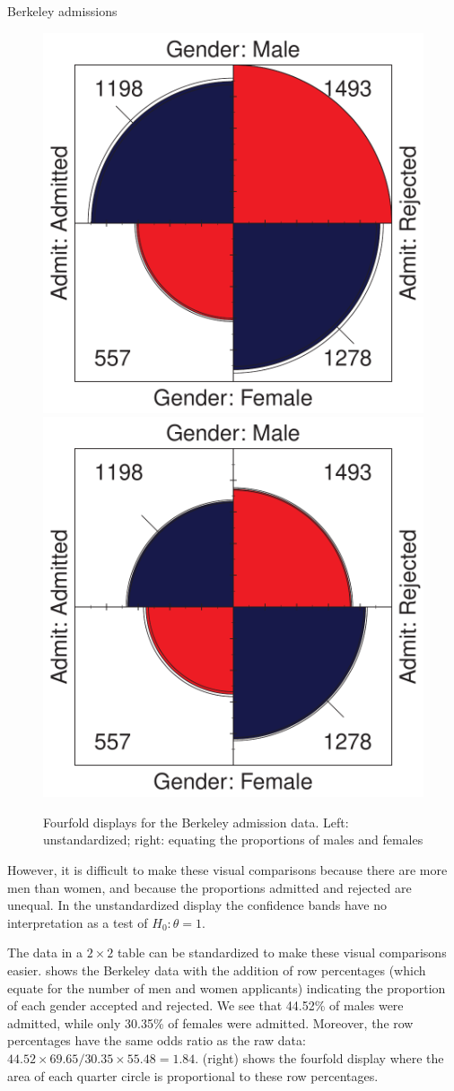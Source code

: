 \documentclass[10pt,krantz2]{krantz}\usepackage[]{graphicx}\usepackage[]{color}
\newenvironment{knitrout}{}{} %
\renewenvironment{knitrout}{\small\renewcommand{\baselinestretch}{.85}}{} %
\begin{document}
\begin{Example}[berkeley2]{Berkeley admissions}
\begin{knitrout}
\begin{figure}[!htbp]
\centerline{\includegraphics[width=.49\textwidth]{ch04/fig/berk-fourfold1-1} 
\includegraphics[width=.49\textwidth]{ch04/fig/berk-fourfold1-2} }

\caption[Fourfold displays for the Berkeley admission data]{Fourfold displays for the Berkeley admission data. Left: unstandardized; right: equating the proportions of males and females}\label{fig:berk-fourfold1}
\end{figure}


\end{knitrout}

However, it is difficult to make these visual comparisons
because there are more men than women, and because the
proportions admitted and rejected are unequal.  In the unstandardized
display the confidence bands have no interpretation as a test
of \(H_0 :  \theta  =  1\).



The data in a $2 \times 2$ table can be standardized to make these
visual comparisons easier.
 shows the Berkeley data with the addition of
row percentages (which equate for the number of men and women applicants)
 indicating the proportion of each gender accepted
and rejected.
We see that 44.52\% of males were admitted, while only 30.35\% of
females were admitted.
Moreover, the row percentages have the same odds ratio as the
raw data: $44.52 \times 69.65 / 30.35 \times 55.48 = 1.84$.
 (right) shows the fourfold display where
the area of each quarter circle is proportional to these row
percentages.


\end{Example}
\end{document}
